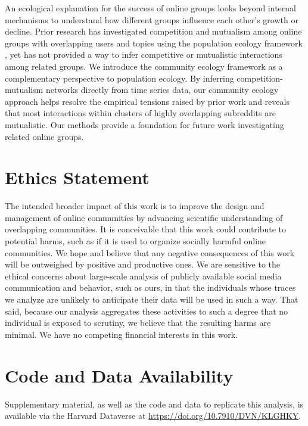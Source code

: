 \documentclass[letterpaper]{article}\usepackage[]{graphicx}\usepackage[]{color}
\begin{document}
An ecological explanation for the success of online groups looks beyond internal mechanisms to understand how different groups influence each other's growth or decline.
Prior research has investigated competition and mutualism among online groups with overlapping users and topics using the population ecology framework \cite{wang_impact_2012, zhu_impact_2014, zhu_selecting_2014}, yet has not provided a way to infer competitive or mutualistic interactions among related groups.
We introduce the community ecology framework as a complementary perspective to population ecology. 
By inferring competition-mutualism networks directly from time series data, our community ecology approach helps resolve the empirical tensions raised by prior work and reveals that most interactions within clusters of highly overlapping subreddits are mutualistic. 
Our methods provide a foundation for future work investigating related online groups.  

\section*{Ethics Statement}

The intended broader impact of this work is to improve the design and management of online communities by advancing scientific understanding of overlapping communities.  It is conceivable that this work could contribute to potential harms, such as if it is used to organize socially harmful online communities.  We hope and believe that any negative consequences of this work will be outweighed by positive and productive ones. We are sensitive to the ethical concerns about large-scale analysis of publicly available social media communication and behavior, such as ours, in that the individuals whose traces we analyze are unlikely to anticipate their data will be used in such a way. That said, because our analysis aggregates these activities to such a degree that no individual is exposed to scrutiny, we believe that the resulting harms are minimal. We have no competing financial interests in this work.

\section*{Code and Data Availability}

Supplementary material, as well as the code and data to replicate this analysis, is available via the Harvard Dataverse at \url{https://doi.org/10.7910/DVN/KLGHKY}.
\end{document}
